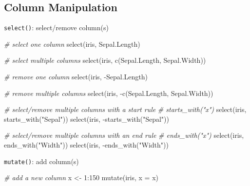 \documentclass[
]{book}
\newenvironment{Shaded}{\begin{snugshade}}{\end{snugshade}}
\newcommand{\AttributeTok}[1]{\textcolor[rgb]{0.77,0.63,0.00}{#1}}
\newcommand{\CommentTok}[1]{\textcolor[rgb]{0.56,0.35,0.01}{\textit{#1}}}
\newcommand{\DecValTok}[1]{\textcolor[rgb]{0.00,0.00,0.81}{#1}}
\newcommand{\FunctionTok}[1]{\textcolor[rgb]{0.00,0.00,0.00}{#1}}
\newcommand{\NormalTok}[1]{#1}
\newcommand{\OtherTok}[1]{\textcolor[rgb]{0.56,0.35,0.01}{#1}}
\newcommand{\SpecialCharTok}[1]{\textcolor[rgb]{0.00,0.00,0.00}{#1}}
\newcommand{\StringTok}[1]{\textcolor[rgb]{0.31,0.60,0.02}{#1}}
\begin{document}
\hypertarget{column-manipulation}{%
\subsection{Column Manipulation}\label{column-manipulation}}

\texttt{select()}: select/remove column(s)

\begin{Shaded}
\begin{Highlighting}[]
\CommentTok{\# select one column}
\FunctionTok{select}\NormalTok{(iris, Sepal.Length)}

\CommentTok{\# select multiple columns}
\FunctionTok{select}\NormalTok{(iris, }\FunctionTok{c}\NormalTok{(Sepal.Length, Sepal.Width))}

\CommentTok{\# remove one column}
\FunctionTok{select}\NormalTok{(iris, }\SpecialCharTok{{-}}\NormalTok{Sepal.Length)}

\CommentTok{\# remove multiple columns}
\FunctionTok{select}\NormalTok{(iris, }\SpecialCharTok{{-}}\FunctionTok{c}\NormalTok{(Sepal.Length, Sepal.Width))}

\CommentTok{\# select/remove multiple columns with a start rule}
\CommentTok{\# starts\_with("x")}
\FunctionTok{select}\NormalTok{(iris, }\FunctionTok{starts\_with}\NormalTok{(}\StringTok{"Sepal"}\NormalTok{))}
\FunctionTok{select}\NormalTok{(iris, }\SpecialCharTok{{-}}\FunctionTok{starts\_with}\NormalTok{(}\StringTok{"Sepal"}\NormalTok{))}

\CommentTok{\# select/remove multiple columns with an end rule}
\CommentTok{\# ends\_with("x")}
\FunctionTok{select}\NormalTok{(iris, }\FunctionTok{ends\_with}\NormalTok{(}\StringTok{"Width"}\NormalTok{))}
\FunctionTok{select}\NormalTok{(iris, }\SpecialCharTok{{-}}\FunctionTok{ends\_with}\NormalTok{(}\StringTok{"Width"}\NormalTok{))}
\end{Highlighting}
\end{Shaded}

\texttt{mutate()}: add column(s)

\begin{Shaded}
\begin{Highlighting}[]
\CommentTok{\# add a new column}
\NormalTok{x }\OtherTok{\textless{}{-}} \DecValTok{1}\SpecialCharTok{:}\DecValTok{150}
\FunctionTok{mutate}\NormalTok{(iris, }\AttributeTok{x =}\NormalTok{ x)}
\end{Highlighting}
\end{Shaded}
\end{document}
